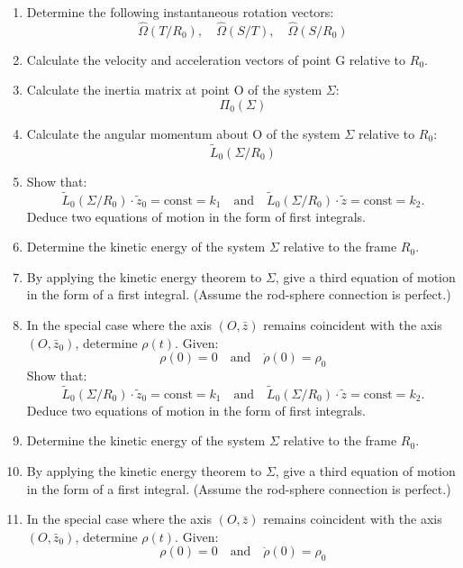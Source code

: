 \documentclass[12pt]{article}
\begin{document}
\begin{enumerate}
    \item Determine the following instantaneous rotation vectors:  
\[
\hat{\Omega} (T/R_0), \quad \hat{\Omega} (S/T), \quad \hat{\Omega} (S/R_0)
\]

    \item Calculate the velocity and acceleration vectors of point G relative to \(R_0\).

    \item Calculate the inertia matrix at point O of the system \(\Sigma\):  
\[
\Pi_0 (\Sigma)
\]

    \item Calculate the angular momentum about O of the system \(\Sigma\) relative to \(R_0\):  
\[
\tilde{L}_0 (\Sigma / R_0)
\]

    \item Show that:  
\[
\tilde{L}_0 (\Sigma / R_0) \cdot \tilde{z}_0 = \text{const} = k_1 \quad \text{and} \quad \tilde{L}_0 (\Sigma / R_0) \cdot \tilde{z} = \text{const} = k_2.
\]  
Deduce two equations of motion in the form of first integrals.

    \item Determine the kinetic energy of the system \(\Sigma\) relative to the frame \(R_0\).

    \item By applying the kinetic energy theorem to \(\Sigma\), give a third equation of motion in the form of a first integral. (Assume the rod-sphere connection is perfect.)

    \item In the special case where the axis \((O, \bar{z})\) remains coincident with the axis \((O, \bar{z}_0)\), determine \(\rho(t)\). Given:  
\[
\rho(0) = 0 \quad \text{and} \quad \dot{\rho}(0) = \rho_0
\]
Show that:  
\[
\tilde{L}_0 (\Sigma / R_0) \cdot \tilde{z}_0 = \text{const} = k_1 \quad \text{and} \quad \tilde{L}_0 (\Sigma / R_0) \cdot \tilde{z} = \text{const} = k_2.
\]  
Deduce two equations of motion in the form of first integrals.

    \item Determine the kinetic energy of the system \(\Sigma\) relative to the frame \(R_0\).

    \item By applying the kinetic energy theorem to \(\Sigma\), give a third equation of motion in the form of a first integral. (Assume the rod-sphere connection is perfect.)

    \item In the special case where the axis \((O, \bar{z})\) remains coincident with the axis \((O, \bar{z}_0)\), determine \(\rho(t)\). Given:  
\[
\rho(0) = 0 \quad \text{and} \quad \dot{\rho}(0) = \rho_0
\]
\end{enumerate}
\end{document}
